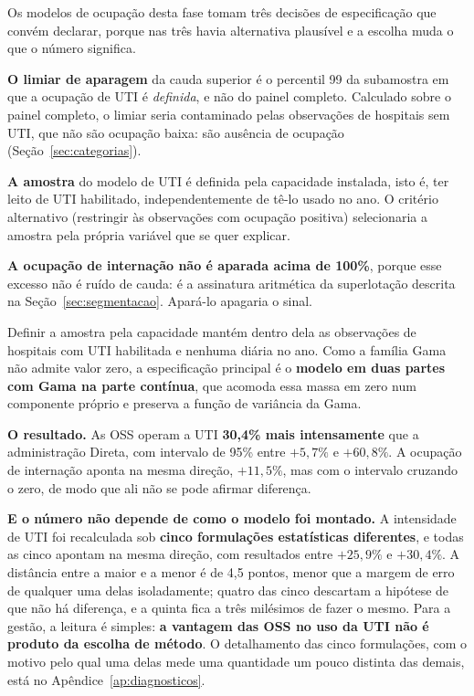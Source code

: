 Os modelos de ocupação desta fase tomam três decisões de especificação que
convém declarar, porque nas três havia alternativa plausível e a escolha
muda o que o número significa.

\textbf{O limiar de aparagem} da cauda superior é o percentil 99 da
subamostra em que a ocupação de UTI é \emph{definida}, e não do painel
completo. Calculado sobre o painel completo, o limiar seria contaminado
pelas observações de hospitais sem UTI, que não são ocupação baixa: são
ausência de ocupação (Seção~\ref{sec:categorias}).

\textbf{A amostra} do modelo de UTI é definida pela capacidade instalada,
isto é, ter leito de UTI habilitado, independentemente de tê-lo usado no
ano. O critério alternativo (restringir às observações com ocupação
positiva) selecionaria a amostra pela própria variável que se quer
explicar.

\textbf{A ocupação de internação não é aparada acima de 100\%}, porque esse
excesso não é ruído de cauda: é a assinatura aritmética da superlotação
descrita na Seção~\ref{sec:segmentacao}. Apará-lo apagaria o sinal.

Definir a amostra pela capacidade mantém dentro dela as observações de
hospitais com UTI habilitada e nenhuma diária no ano. Como a família Gama
não admite valor zero, a especificação principal é o \textbf{modelo em duas
partes com Gama na parte contínua}, que acomoda essa massa em zero num
componente próprio e preserva a função de variância da Gama.

\textbf{O resultado.} As OSS operam a UTI \textbf{30,4\% mais
intensamente} que a administração Direta, com intervalo de 95\% entre
$+5{,}7\%$ e $+60{,}8\%$. A ocupação de internação aponta na mesma direção,
$+11{,}5\%$, mas com o intervalo cruzando o zero, de modo que ali não se
pode afirmar diferença.

\textbf{E o número não depende de como o modelo foi montado.} A
intensidade de UTI foi recalculada sob \textbf{cinco formulações
estatísticas diferentes}, e todas as cinco apontam na mesma direção, com
resultados entre $+25{,}9\%$ e $+30{,}4\%$. A distância entre a maior e a
menor é de 4,5 pontos, menor que a margem de erro de qualquer
uma delas isoladamente; quatro das cinco descartam a hipótese de que não há
diferença, e a quinta fica a três milésimos de fazer o mesmo. Para a
gestão, a leitura é simples: \textbf{a vantagem das OSS no uso da UTI não é
produto da escolha de método}. O detalhamento das cinco formulações, com o
motivo pelo qual uma delas mede uma quantidade um pouco distinta das
demais, está no Apêndice~\ref{ap:diagnosticos}.

